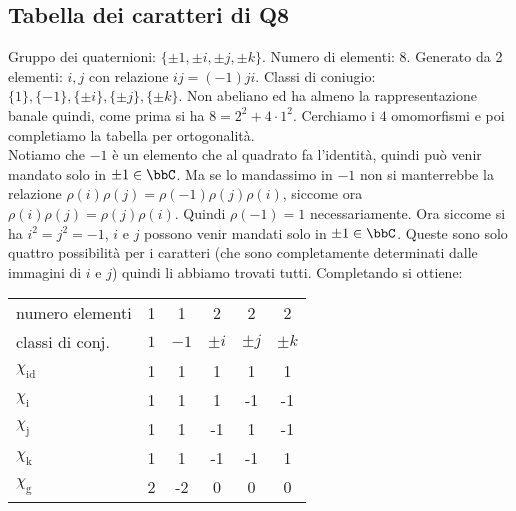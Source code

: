 \documentclass[a4paper,NoNotes,GeneralMath]{stdmdoc}
\begin{document}
	\subsection{Tabella dei caratteri di Q8}
	Gruppo dei quaternioni: $\{\pm 1, \pm i, \pm j, \pm k\}$. Numero di elementi: 8. Generato da 2 elementi: $i, j$ con relazione $ij = (-1)ji$. Classi di coniugio: $\{1\}, \{-1\}, \{\pm i\}, \{\pm j\}, \{\pm k\}$. Non abeliano ed ha almeno la rappresentazione banale quindi, come prima si ha $8 = 2^2 + 4 \cdot 1^2$. Cerchiamo i $4$ omomorfismi e poi completiamo la tabella per ortogonalità. \\
	Notiamo che $-1$ è un elemento che al quadrato fa l'identità, quindi può venir mandato solo in $\pm 1 \in \bbC$. Ma se lo mandassimo in $-1$ non si manterrebbe la relazione $\rho(i)\rho(j) = \rho(-1)\rho(j)\rho(i)$, siccome ora $\rho(i)\rho(j) = \rho(j)\rho(i)$. Quindi $\rho(-1) = 1$ necessariamente. Ora siccome si ha $i^2 = j^2 = -1$, $i$ e $j$ possono venir mandati solo in $\pm 1 \in \bbC$. Queste sono solo quattro possibilità per i caratteri (che sono completamente determinati dalle immagini di $i$ e $j$) quindi li abbiamo trovati tutti. Completando si ottiene: \\
	\begin{center} \begin{tabular}{lccccc}
	numero elementi    & 1   & 1    & 2    & 2    & 2    \\
	classi di conj.    & $1$ & $-1$ & $\pm i$ & $\pm j$ & $\pm k$ \\ \hline
	$\chi_\text{id}$   & 1   & 1    & 1    & 1    & 1   \\
	$\chi_\text{i}$    & 1   & 1    & 1    & -1   & -1  \\
	$\chi_\text{j}$    & 1   & 1    & -1   & 1    & -1  \\
	$\chi_\text{k}$    & 1   & 1    & -1   & -1   & 1   \\
	$\chi_\text{g}$    & 2   & -2   & 0    & 0    & 0   \\
	\end{tabular} \end{center} \vskip 0.5cm
\end{document}
